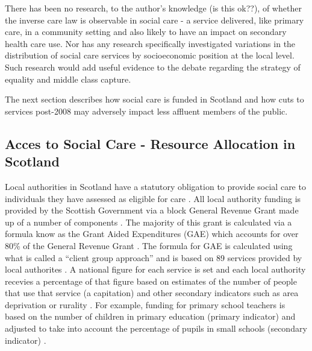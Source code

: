 \documentclass[12pt,]{report}
\begin{document}
There has been no research, to the author's knowledge (is this ok??), of
whether the inverse care law is observable in social care - a service
delivered, like primary care, in a community setting and also likely to
have an impact on secondary health care use. Nor has any research
specifically investigated variations in the distribution of social care
services by socioeconomic position at the local level. Such research
would add useful evidence to the debate regarding the strategy of
equality and middle class capture.

The next section describes how social care is funded in Scotland and how
cuts to services post-2008 may adversely impact less affluent members of
the public.

\subsection{Acces to Social Care - Resource Allocation in Scotland}\label{subsubsec:resources-scot}

Local authorities in Scotland have a statutory obligation to provide
social care to individuals they have assessed as eligible for care
\citep{RN449}. All local authority funding is provided by the Scottish
Government via a block General Revenue Grant made up of a number of
components \citep{RN448, RN445}. The majority of this grant is
calculated via a formula know as the Grant Aided Expenditures (GAE)
which accounts for over 80\% of the General Revenue Grant \citep{RN450}.
The formula for GAE is calculated using what is called a ``client group
approach'' and is based on 89 services provided by local authorites
\citep{RN450}. A national figure for each service is set and each local
authority recevies a percentage of that figure based on estimates of the
number of people that use that service (a capitation) and other
secondary indicators such as area deprivation or rurality
\citep{RN450, RN444}. For example, funding for primary school teachers
is based on the number of children in primary education (primary
indicator) and adjusted to take into account the percentage of pupils in
small schools (secondary indicator) \citep{RN450}.
\end{document}
